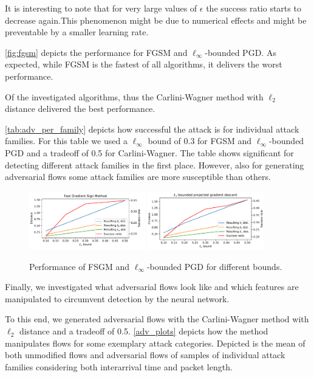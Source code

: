 \documentclass[conference]{IEEEtran}
\begin{document}
It is interesting to note that for very large values of $\epsilon$ the success ratio starts to decrease again.This phenomenon might be due to numerical effects and might be preventable by a smaller learning rate.


\autoref{fig:fgsm} depicts the performance for FGSM and $\ell_\infty$-bounded PGD. As expected, while FGSM is the fastest of all algorithms, it delivers the worst performance.

Of the investigated algorithms, thus the Carlini-Wagner method with $\ell_2$ distance delivered the best performance.

\autoref{tab:adv_per_family} depicts how successful the attack is for individual attack families. For this table we used a $\ell_\infty$ bound of 0.3 for FGSM and $\ell_\infty$-bounded PGD and a tradeoff of 0.5 for Carlini-Wagner. The table shows significant for detecting different attack families in the first place. However, also for generating adversarial flows some attack families are more susceptible than others.

\begin{figure}
\includegraphics[width=0.45\textwidth]{adv_plots/fgsm.pdf}
\includegraphics[width=0.45\textwidth]{adv_plots/l_inf_pgd.pdf}
\caption{Performance of FSGM and $\ell_\infty$-bounded PGD for different bounds.}
\label{fig:fgsm}
\end{figure}

Finally, we investigated what adversarial flows look like and which features are manipulated to circumvent detection by the neural network.

To this end, we generated adversarial flows with the Carlini-Wagner method with $\ell_2$ distance and a tradeoff of 0.5. \autoref{adv_plots} depicts how the method manipulates flows for some exemplary attack categories. Depicted is the mean of both unmodified flows and adversarial flows  of samples of individual attack families considering both interarrival time and packet length.
\end{document}
